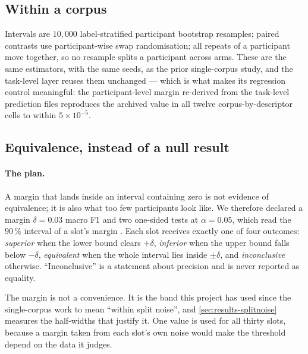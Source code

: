 \subsection{Within a corpus}
\label{sec:stats-within}

Intervals are $10{,}000$ label-stratified participant bootstrap resamples; paired contrasts use
participant-wise swap randomisation; all repeats of a participant move together, so no resample
splits a participant across arms. These are the same estimators, with the same seeds, as the prior
single-corpus study, and the task-level layer reuses them unchanged --- which is what makes its
regression control meaningful: the participant-level margin re-derived from the task-level
prediction files reproduces the archived value in all twelve corpus-by-descriptor cells to within
$5 \times 10^{-5}$.

\subsection{Equivalence, instead of a null result}
\label{sec:stats-equivalence}

\paragraph{The plan.} A margin that lands inside an interval containing zero is not evidence of
equivalence; it is also what too few participants look like. We therefore declared a margin
$\delta = 0.03$ macro F1 and two one-sided tests at $\alpha = 0.05$, which read the $90\,\%$
interval of a slot's margin \citep{schuirmann1987,lakens2018equivalence}. Each slot receives exactly
one of four outcomes: \emph{superior} when the lower bound clears $+\delta$, \emph{inferior} when
the upper bound falls below $-\delta$, \emph{equivalent} when the whole interval lies inside
$\pm\delta$, and \emph{inconclusive} otherwise. ``Inconclusive'' is a statement about precision and
is never reported as equality.

The margin is not a convenience. It is the band this project has used since the single-corpus work
to mean ``within split noise'', and \cref{sec:results-splitnoise} measures the half-widths that
justify it. One value is used for all thirty slots, because a margin taken from each slot's own
noise would make the threshold depend on the data it judges.

